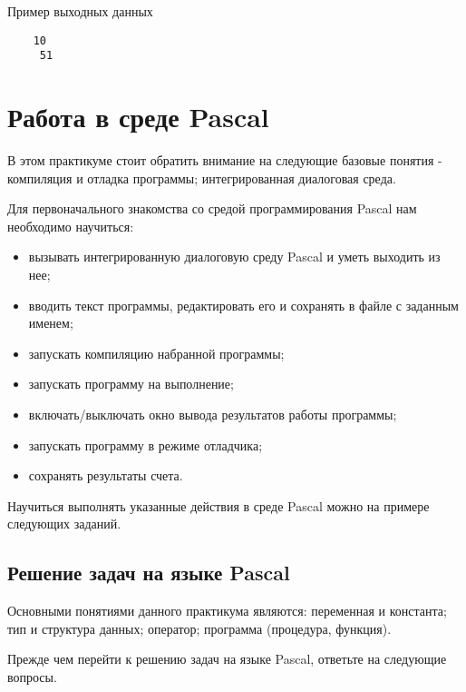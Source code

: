 Пример выходных данных
\begin{verbatim}
    10
     51
\end{verbatim}


\section{Работа в среде  Pascal}

В этом практикуме стоит обратить внимание на следующие базовые понятия - компиляция и отладка программы; интегрированная диалоговая среда.

Для первоначального знакомства со средой программирования Pascal нам необходимо научиться:
\begin{itemize}
	\item вызывать интегрированную диалоговую среду Pascal и уметь выходить из нее;
	\item вводить текст программы, редактировать его и сохранять в файле с заданным именем;
	\item запускать компиляцию набранной программы;
	\item запускать программу на выполнение;
	\item включать/выключать окно вывода результатов работы программы;
	\item запускать программу в режиме отладчика;
	\item сохранять результаты счета.
\end{itemize}

Научиться выполнять указанные действия в среде Pascal можно на примере следующих заданий.

\subsection{Решение задач на языке Pascal}

Основными понятиями данного практикума являются: переменная и константа; тип и структура данных; оператор; программа (процедура, функция).

Прежде чем перейти к решению задач на языке Pascal, ответьте на следующие вопросы.

